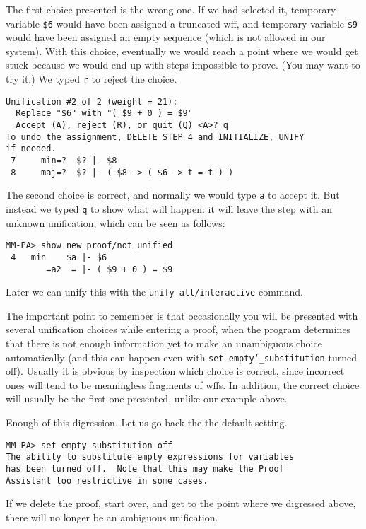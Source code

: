The first choice presented is the wrong one.  If we had selected it,
temporary variable \texttt{\$6} would have been assigned a truncated
wff, and temporary variable \texttt{\$9} would have been assigned an
empty sequence (which is not allowed in our system).  With this choice,
eventually we would reach a point where we would get stuck because
we would end up with steps impossible to prove.  (You may want to
try it.)  We typed \texttt{r} to reject the choice.

\begin{verbatim}
Unification #2 of 2 (weight = 21):
  Replace "$6" with "( $9 + 0 ) = $9"
  Accept (A), reject (R), or quit (Q) <A>? q
To undo the assignment, DELETE STEP 4 and INITIALIZE, UNIFY
if needed.
 7     min=?  $? |- $8
 8     maj=?  $? |- ( $8 -> ( $6 -> t = t ) )
\end{verbatim}

The second choice is correct, and normally we would type \texttt{a}
to accept it.  But instead we typed \texttt{q} to show what will happen:
it will leave the step with an unknown unification, which can be
seen as follows:

\begin{verbatim}
MM-PA> show new_proof/not_unified
 4   min    $a |- $6
        =a2  = |- ( $9 + 0 ) = $9
\end{verbatim}

Later we can unify this with the \texttt{unify all/interactive} command.

The important point to remember is that occasionally you will be
presented with several unification choices while entering a proof, when
the program determines that there is not enough information yet to make
an unambiguous choice automatically (and this can happen even with
\texttt{set empty{\char`\_}substitution} turned off).  Usually it is
obvious by inspection which choice is correct, since incorrect ones will
tend to be meaningless fragments of wffs.  In addition, the correct
choice will usually be the first one presented, unlike our example
above.

Enough of this digression.  Let us go back the the default setting.

\begin{verbatim}
MM-PA> set empty_substitution off
The ability to substitute empty expressions for variables
has been turned off.  Note that this may make the Proof
Assistant too restrictive in some cases.
\end{verbatim}

If we delete the proof, start over, and get to the point where
we digressed above, there will no longer be an ambiguous unification.

